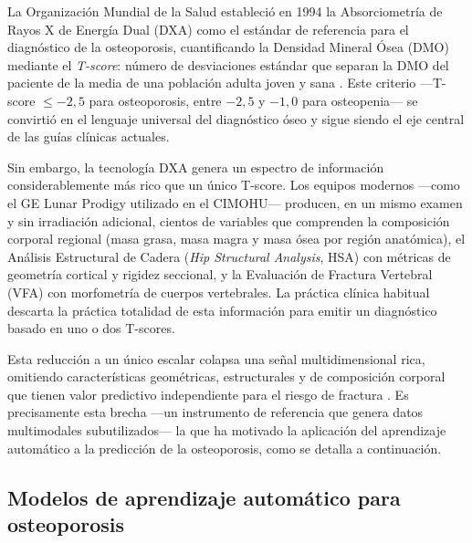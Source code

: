 \documentclass[../tesis.tex]{subfiles}
\begin{document}
La Organización Mundial de la Salud estableció en 1994 la Absorciometría de Rayos X de Energía Dual (DXA) como el estándar de referencia para el diagnóstico de la osteoporosis, cuantificando la Densidad Mineral Ósea (DMO) mediante el \textit{T-score}: número de desviaciones estándar que separan la DMO del paciente de la media de una población adulta joven y sana \cite{WHO1994}. Este criterio ---T-score $\leq -2{,}5$ para osteoporosis, entre $-2{,}5$ y $-1{,}0$ para osteopenia--- se convirtió en el lenguaje universal del diagnóstico óseo y sigue siendo el eje central de las guías clínicas actuales.

Sin embargo, la tecnología DXA genera un espectro de información considerablemente más rico que un único T-score. Los equipos modernos ---como el GE Lunar Prodigy utilizado en el CIMOHU--- producen, en un mismo examen y sin irradiación adicional, cientos de variables que comprenden la composición corporal regional (masa grasa, masa magra y masa ósea por región anatómica), el Análisis Estructural de Cadera (\textit{Hip Structural Analysis}, HSA) con métricas de geometría cortical y rigidez seccional, y la Evaluación de Fractura Vertebral (VFA) con morfometría de cuerpos vertebrales. La práctica clínica habitual descarta la práctica totalidad de esta información para emitir un diagnóstico basado en uno o dos T-scores.

Esta reducción a un único escalar colapsa una señal multidimensional rica, omitiendo características geométricas, estructurales y de composición corporal que tienen valor predictivo independiente para el riesgo de fractura \parencite{AibarAlmazan2022}. Es precisamente esta brecha ---un instrumento de referencia que genera datos multimodales subutilizados--- la que ha motivado la aplicación del aprendizaje automático a la predicción de la osteoporosis, como se detalla a continuación.

\subsection{Modelos de aprendizaje automático para osteoporosis}
\end{document}

